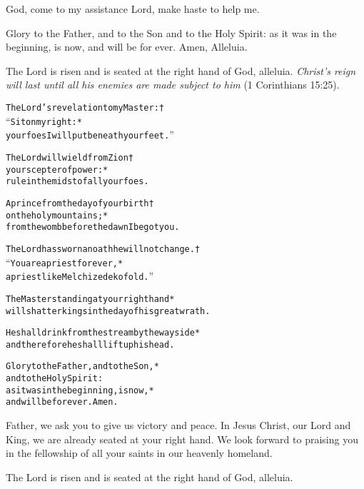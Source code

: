 \documentclass{article}
\begin{document}
God, \instruct{+} come to my assistance
\instruct{---} Lord, make haste to help me.

Glory to the Father, and to the Son and to the Holy Spirit:
\instruct{---} as it was in the beginning, is now, and will be for ever. Amen, Alleluia.

 The Lord is risen and is seated at the right hand of God, alleluia.  
\textit{Christ’s reign will last until all his enemies are made subject to him}
(1 Corinthians 15:25).

\begin{alltt}\normalfont
The Lord’s revelation to my Master: †
“Sit on my right: *
your foes I will put beneath your feet.”

The Lord will wield from Zion †
your scepter of power: *
rule in the midst of all your foes.

A prince from the day of your birth †
on the holy mountains; *
from the womb before the dawn I begot you.

The Lord has sworn an oath he will not change. †
“You are a priest for ever, *
a priest like Melchizedek of old.”

The Master standing at your right hand *
will shatter kings in the day of his great wrath.

He shall drink from the stream by the wayside *
and therefore he shall lift up his head.

Glory to the Father, and to the Son, *
and to the Holy Spirit:
as it was in the beginning, is now, *
and will be for ever. Amen.
\end{alltt}
{}

Father, we ask you to give us victory and peace. In Jesus Christ, our Lord and King, we are already seated at your right hand. We look forward to praising you in the fellowship of all your saints in our heavenly homeland.

 The Lord is risen and is seated at the right hand of God, alleluia.

\end{document}
